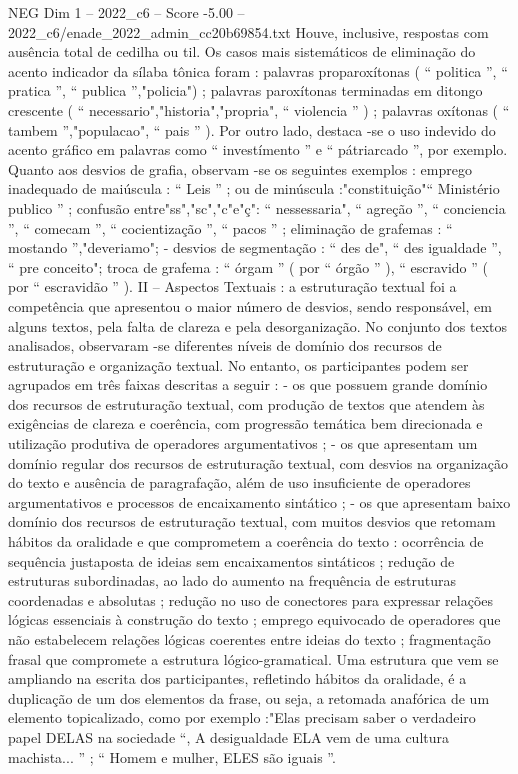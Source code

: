 \begin{textsample}{NEG Dim 1 – 2022\_c6 – Score -5.00 – 2022\_c6/enade\_2022\_admin\_cc20b69854.txt}
Houve, inclusive, respostas com ausência total de cedilha ou til.
Os casos mais sistemáticos de eliminação do acento indicador da sílaba tônica foram : palavras proparoxítonas ( “ politica ”, “ pratica ”, “ publica ”,"policia") ; palavras paroxítonas terminadas em ditongo crescente ( “ necessario","historia","propria", “ violencia ” ) ; palavras oxítonas ( “ tambem ”,"populacao", “ pais ” ).
Por outro lado, destaca -se o uso indevido do acento gráfico em palavras como “ investímento ” e “ pátriarcado ”, por exemplo.
Quanto aos desvios de grafia, observam -se os seguintes exemplos : emprego inadequado de maiúscula : “ Leis ” ; ou de minúscula :"constituição"“ Ministério publico ” ; confusão entre"ss","sc","c"e"ç": “ nessessaria", “ agreção ”, “ conciencia ”, “ comecam ”, “ cocientização ”, “ pacos ” ; eliminação de grafemas : “ mostando ”,"deveriamo"; - desvios de segmentação : “ des de", “ des igualdade ”, “ pre conceito"; troca de grafema : “ órgam ” ( por “ órgão ” ), “ escravido ” ( por “ escravidão ” ).
II – Aspectos Textuais : a estruturação textual foi a competência que apresentou o maior número de desvios, sendo responsável, em alguns textos, pela falta de clareza e pela desorganização.
No conjunto dos textos analisados, observaram -se diferentes níveis de domínio dos recursos de estruturação e organização textual.
No entanto, os participantes podem ser agrupados em três faixas descritas a seguir : - os que possuem grande domínio dos recursos de estruturação textual, com produção de textos que atendem às exigências de clareza e coerência, com progressão temática bem direcionada e utilização produtiva de operadores argumentativos ; - os que apresentam um domínio regular dos recursos de estruturação textual, com desvios na organização do texto e ausência de paragrafação, além de uso insuficiente de operadores argumentativos e processos de encaixamento sintático ; - os que apresentam baixo domínio dos recursos de estruturação textual, com muitos desvios que retomam hábitos da oralidade e que comprometem a coerência do texto : ocorrência de sequência justaposta de ideias sem encaixamentos sintáticos ; redução de estruturas subordinadas, ao lado do aumento na frequência de estruturas coordenadas e absolutas ; redução no uso de conectores para expressar relações lógicas essenciais à construção do texto ; emprego equivocado de operadores que não estabelecem relações lógicas coerentes entre ideias do texto ; fragmentação frasal que compromete a estrutura lógico-gramatical.
Uma estrutura que vem se ampliando na escrita dos participantes, refletindo hábitos da oralidade, é a duplicação de um dos elementos da frase, ou seja, a retomada anafórica de um elemento topicalizado, como por exemplo :"Elas precisam saber o verdadeiro papel DELAS na sociedade “, A desigualdade ELA vem de uma cultura machista... ” ; “ Homem e mulher, ELES são iguais ”.

\end{textsample}
